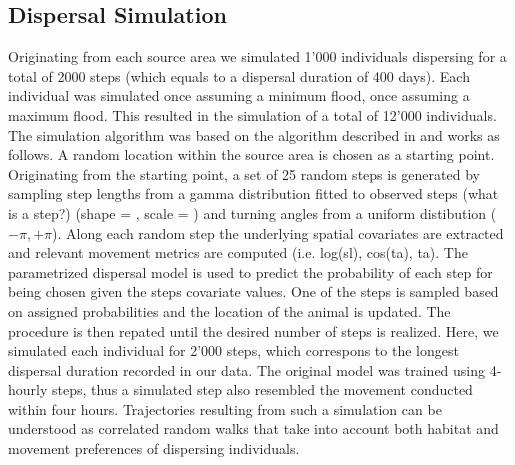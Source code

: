 \documentclass[abstract=on,10pt,a4paper,bibliography=totocnumbered]{article}
\begin{document}
\subsection{Dispersal Simulation}
Originating from each source area we simulated 1'000 individuals dispersing for
a total of 2000 steps (which equals to a dispersal duration of 400 days). Each
individual was simulated once assuming a minimum flood, once assuming a maximum
flood. This resulted in the simulation of a total of 12'000 individuals. The
simulation algorithm was based on the algorithm described in 
and works as follows. A random location within the source area is chosen as a
starting point. Originating from the starting point, a set of 25 random steps is
generated by sampling step lengths from a gamma distribution fitted to observed
steps (what is a step?) (shape = , scale = ) and turning angles from a uniform
distibution ($-\pi, +\pi$). Along each random step the underlying spatial
covariates are extracted and relevant movement metrics are computed (i.e.
log(sl), cos(ta), ta). The parametrized dispersal model is used to predict the
probability of each step for being chosen given the steps covariate values. One
of the steps is sampled based on assigned probabilities and the location of the
animal is updated. The procedure is then repated until the desired number of
steps is realized. Here, we simulated each individual for 2'000 steps, which
correspons to the longest dispersal duration recorded in our data. The original
model was trained using 4-hourly steps, thus a simulated step also resembled the
movement conducted within four hours. Trajectories resulting from such a
simulation can be understood as correlated random walks that take into account
both habitat and movement preferences of dispersing individuals.

%
\end{document}
